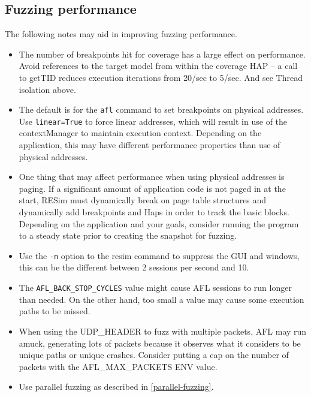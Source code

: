 \documentclass[titlepage]{article}
\begin{document}
\subsection{Fuzzing performance}
The following notes may aid in improving fuzzing performance.
\begin{itemize}
\item The number of breakpoints hit for coverage has a large effect on performance.
Avoid references to the target model from within the coverage HAP -- a call to getTID reduces execution iterations from 20/sec to 5/sec.
And see Thread isolation above.

\item The default is for the {\tt afl} command to set breakpoints on physical addresses.  Use {\tt linear=True} to force linear addresses, which will
result in use of the contextManager to maintain execution context.  Depending on the application, this may have different performance properties than 
use of physical addresses.  

\item One thing that may affect performance when using physical addresses is paging. If a significant amount of application code is not paged in at the
start, RESim must dynamically break on page table structures and dynamically add breakpoints and Haps in order to track the basic blocks.  Depending on
the  application and your goals, consider running the program to a steady state prior to creating the snapshot for fuzzing.

\item Use the {\tt -n} option to the resim command to suppress the GUI and windows, this can be the different between 2 sessions per second and 10.

\item The {\tt AFL\_BACK\_STOP\_CYCLES} value might cause AFL sessions to run longer than needed.  On the other hand, too small a value may cause some
execution paths to be missed.

\item When using the UDP\_HEADER to fuzz with multiple packets, AFL may run amuck, generating lots of packets because it observes what it considers
to be unique paths or unique crashes.  Consider putting a cap on the number of packets with the AFL\_MAX\_PACKETS ENV value. 

\item Use parallel fuzzing as described in \ref{parallel-fuzzing}.
\end{itemize}
\end{document}
